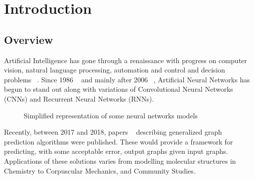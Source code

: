 \section{Introduction}

\subsection{Overview}
Artificial Intelligence has gone through a renaissance with progress on computer vision, natural language processing, automation and control and decision problems ~\cite{Battaglia_2018}. Since 1986 ~\cite{Rumelhart_1986} and mainly after 2006 ~\cite{Hinton_2006}, Artificial Neural Networks has begun to stand out along with variations of Convolutional Neural Networks (CNNs) and Recurrent Neural Networks (RNNs).


\begin{figure}[!htb]
\centering
{}
\caption{Simplified representation of some neural networks models ~\cite{Battaglia_2018}}

\label{fig:img1}
\end{figure}

Recently, between 2017 and 2018, papers ~\cite{Battaglia_2018, Gilmer_2017, Wang_2018} describing generalized graph prediction algorithms were published. These would provide a framework for predicting, with some acceptable error, output graphs given input graphs. Applications of these solutions varies from modelling molecular structures in Chemistry to Corpuscular Mechanics, and Community Studies.

